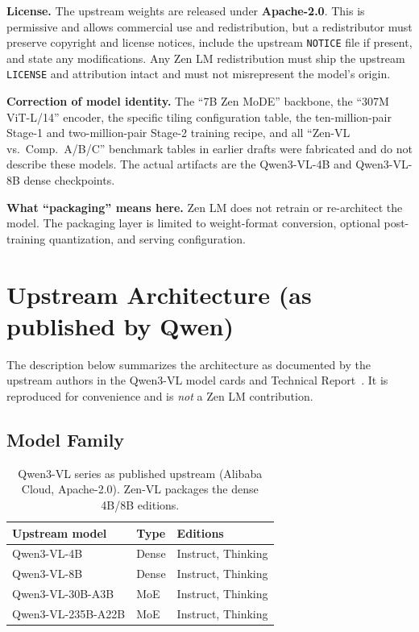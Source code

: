 \documentclass[11pt,a4paper]{article}
\begin{document}
\textbf{License.} The upstream weights are released under \textbf{Apache-2.0}. This is
permissive and allows commercial use and redistribution, but a redistributor must preserve
copyright and license notices, include the upstream \texttt{NOTICE} file if present, and
state any modifications. Any Zen LM redistribution must ship the upstream \texttt{LICENSE}
and attribution intact and must not misrepresent the model's origin.

\textbf{Correction of model identity.} The ``7B Zen MoDE'' backbone, the ``307M ViT-L/14''
encoder, the specific tiling configuration table, the ten-million-pair Stage-1 and
two-million-pair Stage-2 training recipe, and all ``Zen-VL vs.\ Comp.\ A/B/C'' benchmark
tables in earlier drafts were fabricated and do not describe these models. The actual
artifacts are the Qwen3-VL-4B and Qwen3-VL-8B dense checkpoints.

\textbf{What ``packaging'' means here.} Zen LM does not retrain or re-architect the model.
The packaging layer is limited to weight-format conversion, optional post-training
quantization, and serving configuration.

\section{Upstream Architecture (as published by Qwen)}

The description below summarizes the architecture as documented by the upstream authors in
the Qwen3-VL model cards and Technical Report~\cite{qwen3vl4b,qwen3vlreport}. It is
reproduced for convenience and is \emph{not} a Zen LM contribution.

\subsection{Model Family}

\begin{table}[H]
\centering
\caption{Qwen3-VL series as published upstream (Alibaba Cloud, Apache-2.0). Zen-VL packages
the dense 4B/8B editions.}
\label{tab:family}
\begin{tabular}{lll}
\toprule
\textbf{Upstream model} & \textbf{Type} & \textbf{Editions} \\
\midrule
Qwen3-VL-4B        & Dense        & Instruct, Thinking \\
Qwen3-VL-8B        & Dense        & Instruct, Thinking \\
Qwen3-VL-30B-A3B   & MoE          & Instruct, Thinking \\
Qwen3-VL-235B-A22B & MoE          & Instruct, Thinking \\
\bottomrule
\end{tabular}
\end{table}
\end{document}
